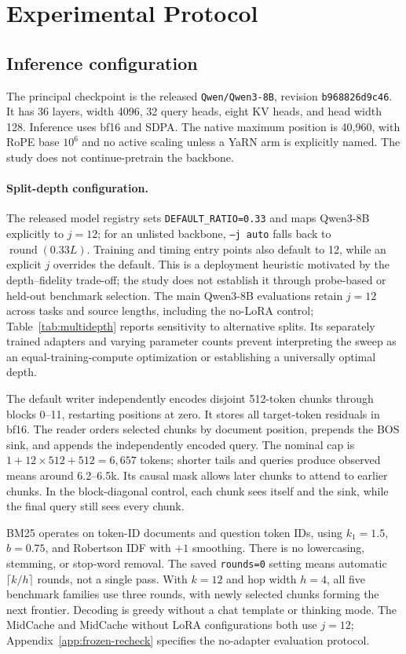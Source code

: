 \FloatBarrier
\section{Experimental Protocol}
\label{app:protocol}
\subsection{Inference configuration}
The principal checkpoint is the released \texttt{Qwen/Qwen3-8B}, revision \texttt{b968826d9c46}. It has 36 layers, width 4096, 32 query heads, eight KV heads, and head width 128. Inference uses bf16 and SDPA. The native maximum position is 40,960, with RoPE base $10^6$ and no active scaling unless a YaRN arm is explicitly named. The study does not continue-pretrain the backbone.

\paragraph{Split-depth configuration.}
\label{app:split-choice}
The released model registry sets \texttt{DEFAULT\_RATIO=0.33} and maps Qwen3-8B explicitly to $j=12$; for an unlisted backbone, \texttt{--j auto} falls back to $\operatorname{round}(0.33L)$. Training and timing entry points also default to 12, while an explicit $j$ overrides the default. This is a deployment heuristic motivated by the depth--fidelity trade-off; the study does not establish it through probe-based or held-out benchmark selection. The main Qwen3-8B evaluations retain $j=12$ across tasks and source lengths, including the no-LoRA control; Table~\ref{tab:multidepth} reports sensitivity to alternative splits. Its separately trained adapters and varying parameter counts prevent interpreting the sweep as an equal-training-compute optimization or establishing a universally optimal depth.

The default writer independently encodes disjoint 512-token chunks through blocks 0--11, restarting positions at zero. It stores all target-token residuals in bf16. The reader orders selected chunks by document position, prepends the BOS sink, and appends the independently encoded query. The nominal cap is $1+12\times512+512=6{,}657$ tokens; shorter tails and queries produce observed means around 6.2--6.5k. Its causal mask allows later chunks to attend to earlier chunks. In the block-diagonal control, each chunk sees itself and the sink, while the final query still sees every chunk.

BM25 operates on token-ID documents and question token IDs, using $k_1=1.5$, $b=0.75$, and Robertson IDF with $+1$ smoothing. There is no lowercasing, stemming, or stop-word removal. The saved \texttt{rounds=0} setting means automatic $\lceil k/h\rceil$ rounds, not a single pass. With $k=12$ and hop width $h=4$, all five benchmark families use three rounds, with newly selected chunks forming the next frontier. Decoding is greedy without a chat template or thinking mode. The MidCache and MidCache without LoRA configurations both use $j=12$; Appendix~\ref{app:frozen-recheck} specifies the no-adapter evaluation protocol.

